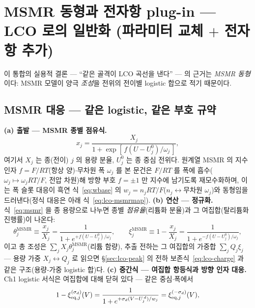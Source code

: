 \section{MSMR 동형과 전자항 plug-in --- LCO 로의 일반화 (파라미터 교체 $+$ 전자항 추가)}\label{sec:lco-code}
이 통합의 실용적 결론 --- ``같은 골격이 LCO 곡선을 낸다'' --- 의 근거는 \emph{MSMR 동형}이다:
MSMR 모델\cite{msmr2024}이 양극 \emph{조성}을 전위의 전이별 logistic
합으로 적기 때문이다.

\subsection{MSMR 대응 --- 같은 logistic, 같은 부호 규약}\label{sec:lco-code-msmr}
\textbf{(a) 출발 --- MSMR 종별 점유식.}
\begin{equation}
x_j=\frac{X_j}{1+\exp[\,f(U-U_j^0)/\omega_j\,]},
\label{eq:msmr}
\end{equation}
여기서 $X_j$ 는 종(전이) $j$ 의 용량 분율, $U_j^0$ 는 종 중심 전위다. 원계열 MSMR 의 지수 인자
$f=F/RT$(항상 양)$\cdot$무차원 폭 $\omega_j$ 를 본 문건은 $F/RT$ 를 폭에 흡수($\omega_j\mapsto\omega_jRT/F$,
전압 차원)해 방향 부호 $f=\pm1$ 만 지수에 남기도록 재모수화하며, 이는 폭 슬롯 대응이 흑연
식~\eqref{eq:wbase} 의 $w_j=n_jRT/F$($n_j\leftrightarrow$무차원 $\omega_j$)와 동형임을 드러낸다(정식
대응은 아래 식~\eqref{eq:lco-msmrmap}).
\textbf{(b) 연산 --- 정규화.} 식~\eqref{eq:msmr} 을 종 용량으로 나누면
종별 \emph{점유율}(리튬화 분율)과 그 여집합(탈리튬화 진행률)이 나온다:
\begin{equation}
\theta_j^{\mathrm{MSMR}}\equiv\frac{x_j}{X_j}=\frac{1}{1+e^{+f(U-U_j^0)/\omega_j}},\qquad
\xi_j^{\mathrm{MSMR}}\equiv1-\frac{x_j}{X_j}=\frac{1}{1+e^{-f(U-U_j^0)/\omega_j}},
\label{eq:lco-msmrnorm}
\end{equation}
이고 총 조성은 $\sum_jX_j\theta_j^{\mathrm{MSMR}}$(리튬 함량), 추출 전하는 그 여집합의 가중합
$\sum_jQ_j\xi_j$ --- 용량 가중 $X_j\!\leftrightarrow\!Q_j$ 로 읽으면 \S\ref{sec:lco-peak} 의 전하
보존식~\eqref{eq:lco-charge} 과 같은 구조(용량-가중 logistic 합)다.
\textbf{(c) 중간식 --- 여집합 항등식과 방향 인자 대응.} Ch1 logistic 서식은 여집합에 대해 닫혀 있다 ---
같은 중심$\cdot$폭에서
\begin{equation}
1-\xi_{\mathrm{eq},j}^{(\sigma_d)}(V)
=\frac{1}{1+e^{+\sigma_d(V-U_j^{\,d})/w_j}}
=\xi_{\mathrm{eq},j}^{(-\sigma_d)}(V),
\label{eq:lco-comp}
\end{equation}
